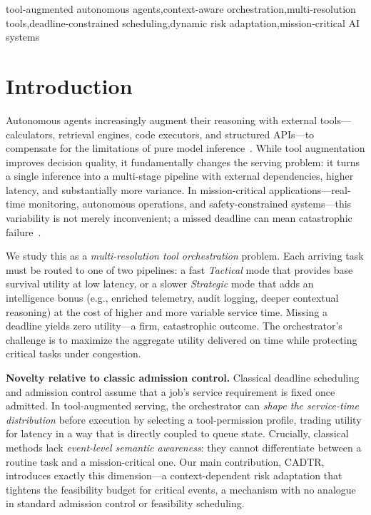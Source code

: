 \documentclass[preprint,12pt]{elsarticle}
\begin{document}
\begin{frontmatter}
\begin{graphicalabstract}
\end{graphicalabstract}


\begin{keyword}
tool-augmented autonomous agents\sep context-aware orchestration\sep multi-resolution tools\sep deadline-constrained scheduling\sep dynamic risk adaptation\sep mission-critical AI systems
\end{keyword}

\end{frontmatter}



\section{Introduction}
Autonomous agents increasingly augment their reasoning with external tools---calculators, retrieval engines, code executors, and structured APIs---to compensate for the limitations of pure model inference~\cite{yao2023react,schick2023toolformer}. While tool augmentation improves decision quality, it fundamentally changes the serving problem: it turns a single inference into a multi-stage pipeline with external dependencies, higher latency, and substantially more variance. In mission-critical applications---real-time monitoring, autonomous operations, and safety-constrained systems---this variability is not merely inconvenient; a missed deadline can mean catastrophic failure~\cite{10.1007/978-3-319-16086-3_16}.

We study this as a \emph{multi-resolution tool orchestration} problem. Each arriving task must be routed to one of two pipelines: a fast \emph{Tactical} mode that provides base survival utility at low latency, or a slower \emph{Strategic} mode that adds an intelligence bonus (e.g., enriched telemetry, audit logging, deeper contextual reasoning) at the cost of higher and more variable service time.  Missing a deadline yields zero utility---a firm, catastrophic outcome.  The orchestrator's challenge is to maximize the aggregate utility delivered on time while protecting critical tasks under congestion.

\noindent\textbf{Novelty relative to classic admission control.}
Classical deadline scheduling and admission control assume that a job's service requirement is fixed once admitted. In tool-augmented serving, the orchestrator can \emph{shape the service-time distribution} before execution by selecting a tool-permission profile, trading utility for latency in a way that is directly coupled to queue state. Crucially, classical methods lack \emph{event-level semantic awareness}: they cannot differentiate between a routine task and a mission-critical one. Our main contribution, CADTR, introduces exactly this dimension---a context-dependent risk adaptation that tightens the feasibility budget for critical events, a mechanism with no analogue in standard admission control or feasibility scheduling.
\end{document}
